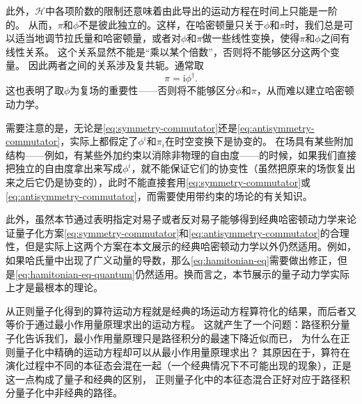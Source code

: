 \documentclass[UTF8, a4paper]{ctexart}
\newcommand*{\ii}{\mathrm{i}}
\begin{document}
此外，$\mathcal{H}$中各项阶数的限制还意味着由此导出的运动方程在时间上只能是一阶的。
从而，$\pi$和$\phi$不是彼此独立的。这样，在哈密顿量只关于$\phi$和$\pi$时，我们总是可以适当地调节拉氏量和哈密顿量，或者对$\phi$和$\pi$做一些线性变换，使得$\pi$和$\phi$之间有线性关系。
这个关系显然不能是“乘以某个倍数”，否则将不能够区分这两个变量。
因此两者之间的关系涉及复共轭。通常取
\begin{equation}
    \pi = \ii \phi^\dagger.
\end{equation}
这也表明了取$\phi$为复场的重要性——否则将不能够区分$\phi$和$\pi$，从而难以建立哈密顿动力学。

需要注意的是，无论是\eqref{eq:symmetry-commutator}还是\eqref{eq:antisymmetry-commutator}，实际上都假定了$\phi^i$和$\pi_i$在时空变换下是协变的。
在场具有某些附加结构——例如，有某些外加约束以消除非物理的自由度——的时候，如果我们直接把独立的自由度拿出来写成$\phi^i$，就不能保证它们的协变性（虽然把原来的场恢复出来之后它仍是协变的），此时不能直接套用\eqref{eq:symmetry-commutator}或\eqref{eq:antisymmetry-commutator}，而需要使用带约束的场论的有关知识。

此外，虽然本节通过表明指定对易子或者反对易子能够得到经典哈密顿动力学来论证量子化方案\eqref{eq:symmetry-commutator}和\eqref{eq:antisymmetry-commutator}的合理性，但是实际上这两个方案在本文展示的经典哈密顿动力学以外仍然适用。例如，如果哈氏量中出现了广义动量的导数，那么\eqref{eq:hamitonian-eq}需要做出修正，但是\eqref{eq:hamitonian-eq-quantum}仍然适用。换而言之，本节展示的量子动力学实际上才是最根本的理论。

从正则量子化得到的算符运动方程就是经典的场运动方程算符化的结果，而后者又等价于通过最小作用量原理求出的运动方程。
这就产生了一个问题：路径积分量子化告诉我们，最小作用量原理只是路径积分的最速下降近似而已，
为什么在正则量子化中精确的运动方程却可以从最小作用量原理求出？
其原因在于，算符在演化过程中不同的本征态会混在一起（一个经典情况下不可能出现的现象），正是这一点构成了量子和经典的区别，
正则量子化中的本征态混合正好对应于路径积分量子化中非经典的路径。
\end{document}
